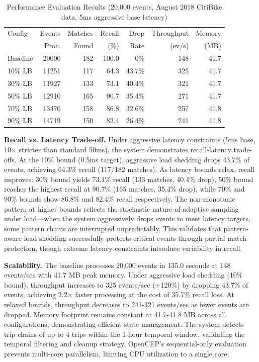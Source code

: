 \documentclass[sigconf]{acmart}
\begin{document}
\begin{table}
  \caption{Performance Evaluation Results (20,000 events, August 2018 CitiBike data, 5ms aggressive base latency)}
  \label{tab:results}
  \begin{tabular}{lrrrrrr}
    \toprule
    Config   & Events & Matches & Recall & Drop   & Throughput & Memory \\
             & Proc.  & Found   & (\%)   & Rate   & (ev/s)     & (MB)   \\
    \midrule
    Baseline & 20000  & 182     & 100.0  & 0\%    & 148        & 41.7   \\
    10\% LB  & 11251  & 117     & 64.3   & 43.7\% & 325        & 41.7   \\
    30\% LB  & 11927  & 133     & 73.1   & 40.4\% & 321        & 41.7   \\
    50\% LB  & 12910  & 165     & 90.7   & 35.4\% & 271        & 41.7   \\
    70\% LB  & 13470  & 158     & 86.8   & 32.6\% & 257        & 41.8   \\
    90\% LB  & 14719  & 150     & 82.4   & 26.4\% & 241        & 41.8   \\
    \bottomrule
  \end{tabular}
\end{table}

\textbf{Recall vs. Latency Trade-off.} Under aggressive latency constraints (5ms base, 10× stricter than standard 50ms), the system demonstrates recall-latency trade-offs. At the 10\% bound (0.5ms target), aggressive load shedding drops 43.7\% of events, achieving 64.3\% recall (117/182 matches). As latency bounds relax, recall improves: 30\% bound yields 73.1\% recall (133 matches, 40.4\% drop), 50\% bound reaches the highest recall at 90.7\% (165 matches, 35.4\% drop), while 70\% and 90\% bounds show 86.8\% and 82.4\% recall respectively. The non-monotonic pattern at higher bounds reflects the stochastic nature of adaptive sampling under load—when the system aggressively drops events to meet latency targets, some pattern chains are interrupted unpredictably. This validates that pattern-aware load shedding successfully protects critical events through partial match protection, though extreme latency constraints introduce variability in recall.

\textbf{Scalability.} The baseline processes 20,000 events in 135.0 seconds at 148 events/sec with 41.7 MB peak memory. Under aggressive load shedding (10\% bound), throughput increases to 325 events/sec (+120\%) by dropping 43.7\% of events, achieving 2.2× faster processing at the cost of 35.7\% recall loss. At relaxed bounds, throughput decreases to 241-321 events/sec as fewer events are dropped. Memory footprint remains constant at 41.7-41.8 MB across all configurations, demonstrating efficient state management. The system detects trip chains of up to 4 trips within the 1-hour temporal window, validating the temporal filtering and cleanup strategy. OpenCEP's sequential-only evaluation prevents multi-core parallelism, limiting CPU utilization to a single core.
\end{document}

